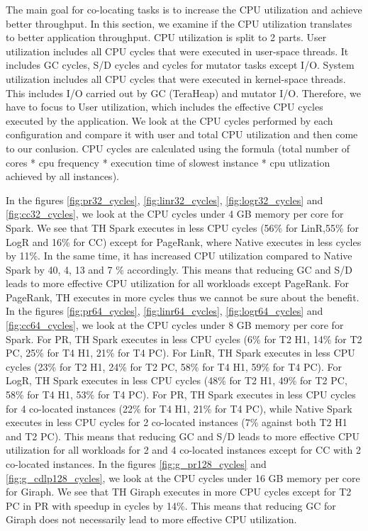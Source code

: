 The main goal for co-locating tasks is to increase the CPU utilization and achieve better
throughput. In this section, we examine if the CPU utilization translates to better application throughput.
CPU utilization is split to 2 parts. 
User utilization includes all CPU cycles that were executed in user-space threads.
It includes GC cycles, S/D cycles and cycles for mutator tasks except I/O.
System utilization includes all CPU cycles that were executed in kernel-space threads.
This includes I/O carried out by GC (TeraHeap) and mutator I/O.
Therefore, we have to focus to User utilization, which includes the effective CPU cycles executed by the application.
We look at the CPU cycles performed by each configuration and compare it with user and total CPU utilization and then come to our conlusion.
CPU cycles are calculated using the formula (total number of cores * cpu frequency * execution time of slowest instance * cpu utlization achieved by all instances).

In the figures \ref{fig:pr32_cycles}, \ref{fig:linr32_cycles}, \ref{fig:logr32_cycles} and \ref{fig:cc32_cycles}, we look at the CPU cycles under 4 GB memory per core for Spark. We see that TH Spark executes in less CPU cycles (56\% for LinR,55\% for LogR and 16\% for CC) except for PageRank, where Native executes in less cycles by 11\%. In the same time, it has increased CPU utilization compared to Native Spark by 40, 4, 13 and 7 \% accordingly.
This means that reducing GC and S/D leads to more effective CPU utilization for all workloads except PageRank. For PageRank, TH executes in more cycles thus we cannot be sure about the benefit.
In the figures \ref{fig:pr64_cycles}, \ref{fig:linr64_cycles}, \ref{fig:logr64_cycles} and \ref{fig:cc64_cycles}, we look at the CPU cycles under 8 GB memory per core for Spark. For PR, TH Spark executes in less CPU cycles (6\% for T2 H1, 14\% for T2 PC, 25\% for T4 H1, 21\% for T4 PC).
For LinR, TH Spark executes in less CPU cycles (23\% for T2 H1, 24\% for T2 PC, 58\% for T4 H1, 59\% for T4 PC).
For LogR, TH Spark executes in less CPU cycles (48\% for T2 H1, 49\% for T2 PC, 58\% for T4 H1, 53\% for T4 PC).
For PR, TH Spark executes in less CPU cycles for 4 co-located instances (22\% for T4 H1, 21\% for T4 PC), while Native Spark executes in less
CPU cycles for 2 co-located instances (7\% against both T2 H1 and T2 PC).
This means that reducing GC and S/D leads to more effective CPU utilization for all workloads for 2 and 4 co-located instances except for CC with 2 co-located instances.
In the figures \ref{fig:g_pr128_cycles} and \ref{fig:g_cdlp128_cycles}, we look at the CPU cycles under 16 GB memory per core for Giraph. We see that TH Giraph executes in more CPU cycles except for T2 PC in PR with speedup in cycles by 14\%.
This means that reducing GC for Giraph does not necessarily lead to more effective CPU utilization.

